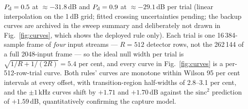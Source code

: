 $P_{\rm d} = 0.5$ at $\approx -31.8$\,dB and $P_{\rm d} = 0.9$ at
$\approx -29.1$\,dB per trial (linear interpolation on the 1\,dB grid;
fitted crossing uncertainties pending; the backup curves are archived
in the sweep summary and deliberately not drawn in
Fig.~\ref{fig:curves}, which shows the deployed rule only). Each trial is one
16\,384-sample frame of \emph{four} input streams --- $R = 512$ detector
rows, not the 262\,144 of a full 2048-input frame --- so the ideal null
width per trial is $\sqrt{1/R + 1/(2R)} = 5.4$ per cent, and every curve
in Fig.~\ref{fig:curves} is a per-512-row-trial curve.
 Both rules' curves
are monotone within Wilson 95 per cent intervals
\citep{wilson1927probable} at every offset, with transition-region
half-widths of 2.8--3.1 per cent, and the $\pm 1$\,kHz
curves shift by $+1.71$ and $+1.70$\,dB against the $\mathrm{sinc}^2$
prediction of $+1.59$\,dB, quantitatively confirming the capture
model.

